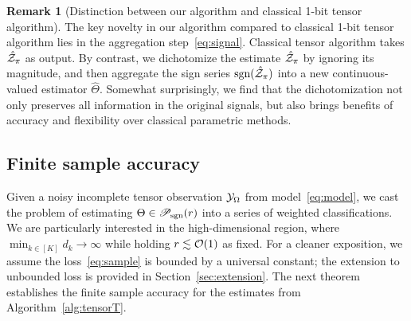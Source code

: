 \documentclass[twoside,11pt]{article}
\theoremstyle{definition}
\newtheorem{rmk}{Remark}
\def\sign{\textup{sgn}}
\def\caliP{\mathscr{P}_{\textup{sgn}}}
\begin{document}
\begin{rmk}[Distinction between our algorithm and classical 1-bit tensor algorithm] 
The key novelty in our algorithm compared to classical 1-bit tensor algorithm lies in the aggregation step~\eqref{eq:signal}. Classical tensor algorithm takes $\hat {\mathcal{Z}}_\pi$ as output. By contrast, we dichotomize the estimate $\hat {\mathcal{Z}}_\pi$ by ignoring its magnitude, and then aggregate the sign series $\sign(\hat \tZ_\pi)$ into a new continuous-valued estimator $\hat \Theta$. Somewhat surprisingly, we find that the dichotomization not only preserves all information in the original signals, but also brings benefits of accuracy and flexibility over classical parametric methods. 
\end{rmk}



\subsection{Finite sample accuracy}\label{sec:error}

Given a noisy incomplete tensor observation $\mathcal{Y}_\Omega$ from model~\eqref{eq:model}, we cast the problem of estimating $\Theta\in\caliP(r)$ into a series of weighted classifications. We are particularly interested in the high-dimensional region, where $\min_{k\in[K]}{d_k} \to \infty$ while holding $r\lesssim \mathcal{O}(1)$ as fixed. For a cleaner exposition, we assume the loss~\eqref{eq:sample} is bounded by a universal constant; the extension to unbounded loss is provided in Section~\ref{sec:extension}. The next theorem establishes the finite sample accuracy for the estimates from Algorithm~\ref{alg:tensorT}. 
\end{document}
